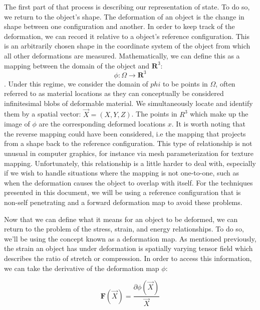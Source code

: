 The first part of that process is describing our representation of
state. To do so, we return to the object's shape. The deformation of
an object is the change in shape between one configuration and
another. In order to keep track of the deformation, we can record it
relative to a object's reference configuration. This is an arbitrarily
chosen shape in the coordinate system of the object from which all
other deformations are measured. Mathematically, we can define this as
a mapping between the domain of the object and $\mathbf{R}^3$:
$$\phi: \Omega \rightarrow \mathbf{R}^3$$. Under this regime, we
consider the domain of $phi$ to be points in $\Omega$, often referred
to as material locations as they can conceptually be considered
infinitesimal blobs of deformable material. We simultaneously locate and
identify them by a spatial vector: $\vec{X} = (X, Y, Z)$. The points
in $R^3$ which make up the image of $\phi$ are the corresponding
deformed locations $x$. It is worth noting that the reverse mapping
could have been considered, i.e the mapping that projects from a shape
back to the reference configuration. This type of relationship is
not unusual in computer graphics, for instance via mesh
parameterization for texture mapping. Unfortunately, this relationship
is a little harder to deal with, especially if we wish to handle
situations where the mapping is not one-to-one, such as when the
deformation causes the object to overlap with itself. For the
techniques presented in this document, we will be using a reference
configuration that is non-self penetrating and a forward deformation
map to avoid these problems.

Now that we can define what it means for an object to be deformed, we
can return to the problem of the stress, strain, and energy
relationships. To do so, we'll be using the concept known as a
deformation map. As mentioned previously, the strain an object has
under deformation is spatially varying tensor field which describes
the ratio of stretch or compression. In order to access this information,
we can take the derivative of the deformation map $\phi$:

\begin{equation}
  \label{equ:deformationgradient}
  \mathbf{F}(\vec{X}) = \frac{\partial \phi(
      \vec{X} )}{ \vec{X} }
\end{equation}

